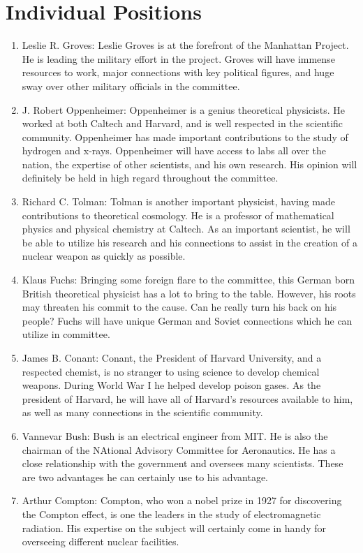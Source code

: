 \documentclass[11 pt, twoside]{article}
\begin{document}
\section{Individual Positions}
\begin{enumerate}
\item Leslie R. Groves: Leslie Groves is at the forefront of the Manhattan Project. He is leading the military effort in the project. Groves will have immense resources to work, major connections with key political figures, and huge sway over other military officials in the committee. 
\item J. Robert Oppenheimer: Oppenheimer is a genius theoretical physicists. He worked at both Caltech and Harvard, and is well respected in the scientific community. Oppenheimer has made important contributions to the study of hydrogen and x-rays. Oppenheimer will have access to labs all over the nation, the expertise of other scientists, and his own research. His opinion will definitely be held in high regard throughout the committee.
\item Richard C. Tolman: Tolman is another important physicist, having made contributions to theoretical cosmology. He is a professor of mathematical physics and physical chemistry at Caltech. As an important scientist, he will be able to utilize his research and his connections to assist in the creation of a nuclear weapon as quickly as possible. 
\item Klaus Fuchs: Bringing some foreign flare to the committee, this German born British theoretical physicist has a lot to bring to the table. However, his roots may threaten his commit to the cause. Can he really turn his back on his people? Fuchs will have unique German and Soviet connections which he can utilize in committee. 
\item James B. Conant: Conant, the President of Harvard University, and a respected chemist, is no stranger to using science to develop chemical weapons. During World War I he helped develop poison gases. As the president of Harvard, he will have all of Harvard’s resources available to him, as well as many connections in the scientific community.
\item Vannevar Bush: Bush is an electrical engineer from MIT. He is also the chairman of the NAtional Advisory Committee for Aeronautics. He has a close relationship with the government and oversees many scientists. These are two advantages he can certainly use to his advantage.
\item Arthur Compton: Compton, who won a nobel prize in 1927 for discovering the Compton effect, is one  the leaders in the study of electromagnetic radiation. His expertise on the subject will certainly come in handy for overseeing different nuclear facilities.

\end{enumerate}
\end{document}
